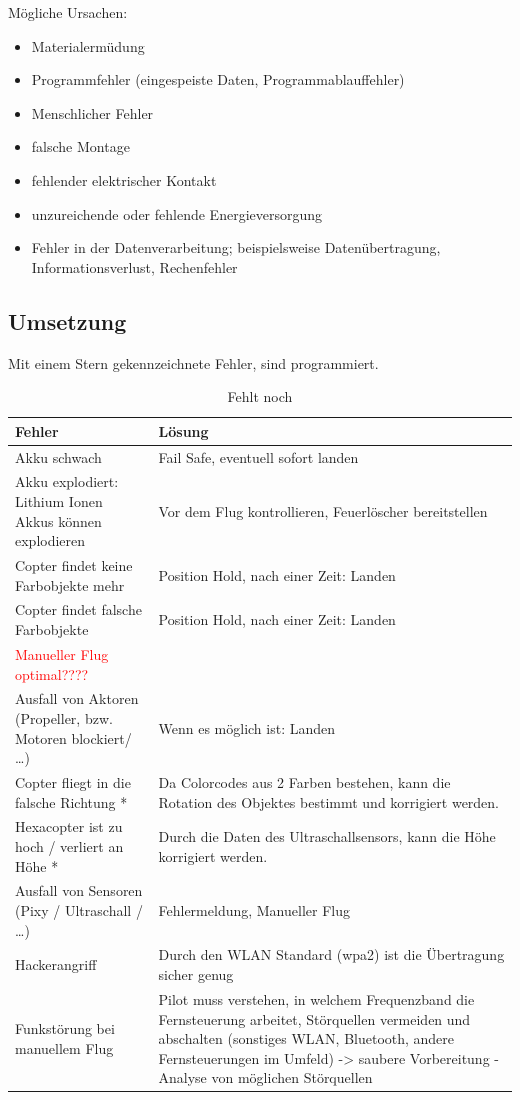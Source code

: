   Mögliche Ursachen: \cite{tech_def}
  \begin{itemize}
  \item Materialermüdung
  \item Programmfehler (eingespeiste Daten, Programmablauffehler)
  \item Menschlicher Fehler
  \item falsche Montage
  \item fehlender elektrischer Kontakt
  \item unzureichende oder fehlende Energieversorgung
  \item Fehler in der Datenverarbeitung; beispielsweise Datenübertragung, Informationsverlust, Rechenfehler
  \end{itemize}


  \subsection{Umsetzung}
  Mit einem Stern gekennzeichnete Fehler, sind programmiert.

\begin{table}[H]
\centering
\begin{tabular}{|p{7cm}|p{7cm}|}
\hline Fehler & Lösung\\\hline
\hline Akku schwach & Fail Safe, eventuell sofort landen\\
\hline Akku explodiert: Lithium Ionen Akkus können explodieren & Vor dem Flug kontrollieren, Feuerlöscher bereitstellen\\
\hline Copter findet keine Farbobjekte mehr & Position Hold, nach einer Zeit: Landen\\
\hline Copter findet falsche Farbobjekte & Position Hold, nach einer Zeit: Landen \\
\textcolor{red}{Manueller Flug optimal????} & \\
\hline Ausfall von Aktoren (Propeller, bzw. Motoren blockiert/ …) &  Wenn es möglich ist: Landen\\
\hline Copter fliegt in die falsche Richtung * & Da Colorcodes aus 2 Farben bestehen, kann die Rotation des Objektes bestimmt und korrigiert werden. \\
\hline Hexacopter ist zu hoch / verliert an Höhe * & Durch die Daten des Ultraschallsensors, kann die Höhe korrigiert werden.\\
\hline Ausfall von Sensoren (Pixy / Ultraschall / …) & Fehlermeldung, Manueller Flug\\
\hline Hackerangriff & Durch den WLAN Standard (wpa2) ist die Übertragung sicher genug\\
\hline Funkstörung bei manuellem Flug & Pilot muss verstehen, in welchem Frequenzband die Fernsteuerung arbeitet, Störquellen vermeiden und abschalten (sonstiges WLAN, Bluetooth, andere Fernsteuerungen im Umfeld) -> saubere Vorbereitung - Analyse von möglichen Störquellen\\
\end{tabular}
\caption{Fehlt noch}
\end{table}

